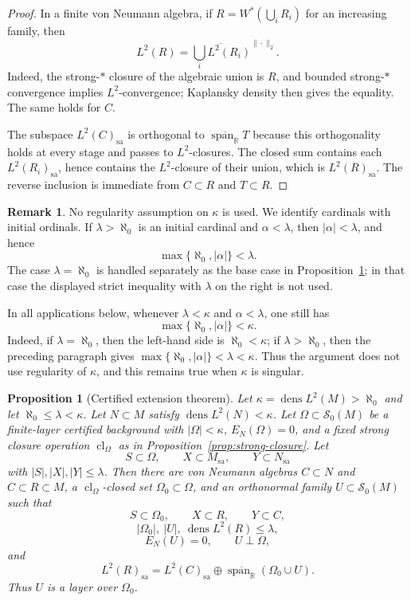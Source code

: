 \documentclass[11pt,letterpaper,reqno]{amsart}
\newtheorem{prop}[thm]{Proposition}
\theoremstyle{definition}
\newtheorem{rem}[thm]{Remark}
\numberwithin{equation}{section}
\newcommand{\sa}{\mathrm{sa}}
\newcommand{\RR}{\mathbb R}
\newcommand{\cl}{\operatorname{cl}}
\DeclareMathOperator{\spanop}{span}
\DeclareMathOperator{\dens}{dens}
\begin{document}
\begin{proof}
In a finite von Neumann algebra, if $R=W^*(\bigcup_iR_i)$ for an increasing family, then
\[
   L^2(R)=\overline{\bigcup_i L^2(R_i)}^{\|\cdot\|_2}.
\]
Indeed, the strong-$*$ closure of the algebraic union is $R$, and bounded strong-$*$ convergence implies $L^2$-convergence; Kaplansky density then gives the equality.  The same holds for $C$.

The subspace $L^2(C)_{\sa}$ is orthogonal to $\overline{\spanop_{\RR}}T$ because this orthogonality holds at every stage and passes to $L^2$-closures.  The closed sum contains each $L^2(R_i)_{\sa}$, hence contains the $L^2$-closure of their union, which is $L^2(R)_{\sa}$.  The reverse inclusion is immediate from $C\subset R$ and $T\subset R$.
\end{proof}

\begin{rem}\label{rem:no-regularity}
No regularity assumption on $\kappa$ is used.  We identify cardinals with
initial ordinals.  If $\lambda>\aleph_0$ is an initial cardinal and
$\alpha<\lambda$, then $|\alpha|<\lambda$, and hence
\[
   \max\{\aleph_0,|\alpha|\}<\lambda .
\]
The case $\lambda=\aleph_0$ is handled separately as the base case in
Proposition~\ref{prop:LBE}; in that case the displayed strict inequality with
$\lambda$ on the right is not used.

In all applications below, whenever $\lambda<\kappa$ and $\alpha<\lambda$, one
still has
\[
   \max\{\aleph_0,|\alpha|\}<\kappa .
\]
Indeed, if $\lambda=\aleph_0$, then the left-hand side is $\aleph_0<\kappa$;
if $\lambda>\aleph_0$, then the preceding paragraph gives
\(\max\{\aleph_0,|\alpha|\}<\lambda<\kappa\).  Thus the argument does not use
regularity of $\kappa$, and this remains true when $\kappa$ is singular.
\end{rem}

\begin{prop}[Certified extension theorem]\label{prop:LBE}
Let $\kappa=\dens L^2(M)>\aleph_0$ and let $\aleph_0\leq\lambda<\kappa$.  Let $N\subset M$ satisfy $\dens L^2(N)<\kappa$.  Let $\Omega\subset\mathcal S_0(M)$ be a finite-layer certified background with $|\Omega|<\kappa$, $E_N(\Omega)=0$, and a fixed strong closure operation $\cl_\Omega$ as in Proposition~\ref{prop:strong-closure}.  Let
\[
   S\subset\Omega,
   \qquad
   X\subset M_{\sa},
   \qquad
   Y\subset N_{\sa}
\]
with $|S|,|X|,|Y|\leq\lambda$.  Then there are von Neumann algebras $C\subset N$ and $C\subset R\subset M$, a $\cl_\Omega$-closed set $\Omega_0\subset\Omega$, and an orthonormal family $U\subset\mathcal S_0(M)$ such that
\[
   S\subset\Omega_0,
   \qquad X\subset R,
   \qquad Y\subset C,
\]
\[
   |\Omega_0|,\ |U|,\ \dens L^2(R)\leq\lambda,
\]
\[
   E_N(U)=0,
   \qquad U\perp\Omega,
\]
and
\[
   L^2(R)_{\sa}=L^2(C)_{\sa}\oplus\overline{\spanop_{\RR}}(\Omega_0\cup U).
\]
Thus $U$ is a layer over $\Omega_0$.
\end{prop}
\end{document}
